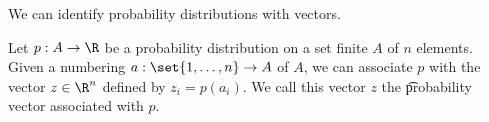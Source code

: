 
We can identify probability distributions with vectors.

Let $p: A \to \R$ be a probability distribution on a set finite $A$ of $n$ elements.
Given a numbering $a: \set{1, \dots, n} \to A$ of $A$, we can associate $p$ with the vector $z \in \R^n$ defined by $z_i = p(a_i)$.
We call this vector $z$ the \t{probability vector} associated with $p$.

\blankpage
